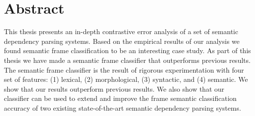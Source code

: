 \chapter*{Abstract}
\thispagestyle{empty}

This thesis presents an in-depth contrastive error analysis of a set of semantic dependency parsing systems. Based on the empirical results of our analysis we found semantic frame classification to be an interesting case study. As part of this thesis we have made a semantic frame classifier that outperforms previous results. The semantic frame classifier is the result of rigorous experimentation with four set of features: (1) lexical, (2) morphological, (3) syntactic, and (4) semantic. We show that our results outperform previous results. We also show that our classifier can be used to extend and improve the frame semantic classification accuracy of two existing state-of-the-art semantic dependency parsing systems.


